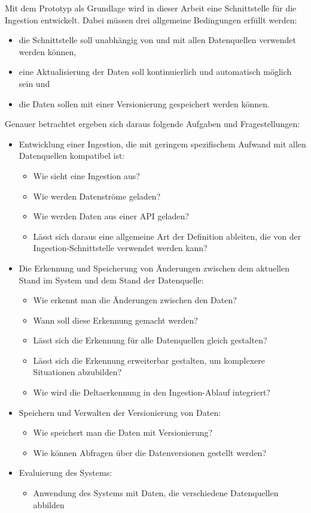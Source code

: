 Mit dem Prototyp als Grundlage wird in dieser Arbeit eine Schnittstelle für die Ingestion entwickelt.
Dabei müssen drei allgemeine Bedingungen erfüllt werden: \begin{itemize}
    \item die Schnittstelle soll unabhängig von und mit allen Datenquellen verwendet werden können,
    \item eine Aktualisierung der Daten soll kontinuierlich und automatisch möglich sein und
    \item die Daten sollen mit einer Versionierung gespeichert werden können.
\end{itemize}
Genauer betrachtet ergeben sich daraus folgende Aufgaben und Fragestellungen: \begin{itemize}
    \item Entwicklung einer Ingestion, die mit geringem spezifischem Aufwand mit allen Datenquellen kompatibel ist: \begin{itemize}
              \item Wie sieht eine Ingestion aus?
              \item Wie werden Datenströme geladen?
              \item Wie werden Daten aus einer API geladen?
              \item Lässt sich daraus eine allgemeine Art der Definition ableiten, die von der Ingestion-Schnittstelle verwendet werden kann?
          \end{itemize}
    \item Die Erkennung und Speicherung von Änderungen zwischen dem aktuellen Stand im System und dem Stand der Datenquelle: \begin{itemize}
              \item Wie erkennt man  die Änderungen zwischen den Daten?
              \item Wann soll diese Erkennung gemacht werden?
              \item Lässt sich die Erkennung für alle Datenquellen gleich gestalten?
              \item Lässt sich die Erkennung erweiterbar gestalten, um komplexere Situationen abzubilden?
              \item Wie wird die Deltaerkennung in den Ingestion-Ablauf integriert?
          \end{itemize}
    \item Speichern und Verwalten der Versionierung von Daten: \begin{itemize}
              \item Wie speichert man die Daten mit Versionierung?
              \item Wie können Abfragen über die Datenversionen gestellt werden?
          \end{itemize}
    \item Evaluierung des Systems: \begin{itemize}
              \item Anwendung des Systems mit Daten, die verschiedene Datenquellen abbilden
          \end{itemize}
\end{itemize}

